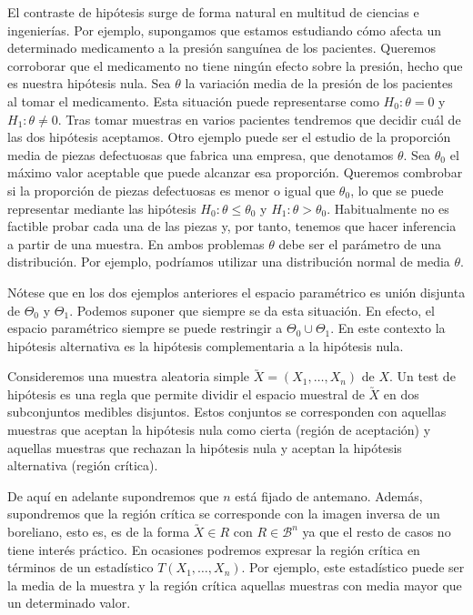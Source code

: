     El contraste de hipótesis surge de forma natural en multitud de ciencias e ingenierías. Por ejemplo, supongamos que estamos estudiando cómo afecta un determinado medicamento a la presión sanguínea de los pacientes. Queremos corroborar que el medicamento no tiene ningún efecto sobre la presión, hecho que es nuestra hipótesis nula. Sea $\theta$ la variación media de la presión de los pacientes al tomar el medicamento. Esta situación puede representarse como $H_0: \theta = 0$ y $H_1: \theta \ne 0$. Tras tomar muestras en varios pacientes tendremos que decidir cuál de las dos hipótesis aceptamos. Otro ejemplo puede ser el estudio de la proporción media de piezas defectuosas que fabrica una empresa, que denotamos $\theta$. Sea $\theta_0$ el máximo valor aceptable que puede alcanzar esa proporción. Queremos combrobar si la proporción de piezas defectuosas es menor o igual que $\theta_0$, lo que se puede representar mediante las hipótesis $H_0: \theta \le \theta_0$ y $H_1: \theta > \theta_0$. Habitualmente no es factible probar cada una de las piezas y, por tanto, tenemos que hacer inferencia a partir de una muestra. En ambos problemas $\theta$ debe ser el parámetro de una distribución. Por ejemplo, podríamos utilizar una distribución normal de media $\theta$.

    Nótese que en los dos ejemplos anteriores el espacio paramétrico es unión disjunta de $\Theta_0$ y $\Theta_1$. Podemos suponer que siempre se da esta situación. En efecto, el espacio paramétrico siempre se puede restringir a $\Theta_0 \cup \Theta_1$. En este contexto la hipótesis alternativa es la hipótesis complementaria a la hipótesis nula.

    \begin{definition}
        Consideremos una muestra aleatoria simple $\utilde{X} = (X_1, \dots, X_n)$ de $X$. Un test de hipótesis es una regla que permite dividir el espacio muestral de $\utilde{X}$ en dos subconjuntos medibles disjuntos. Estos conjuntos se corresponden con aquellas muestras que aceptan la hipótesis nula como cierta (región de aceptación) y aquellas muestras que rechazan la hipótesis nula y aceptan la hipótesis alternativa (región crítica).
    \end{definition}

    De aquí en adelante supondremos que $n$ está fijado de antemano. Además, supondremos que la región crítica se corresponde con la imagen inversa de un boreliano, esto es, es de la forma $\utilde{X} \in R$ con $R \in \mathcal{B}^n$ ya que el resto de casos no tiene interés práctico. En ocasiones podremos expresar la región crítica en términos de un estadístico $T(X_1, \ldots, X_n)$. Por ejemplo, este estadístico puede ser la media de la muestra y la región crítica aquellas muestras con media mayor que un determinado valor.

